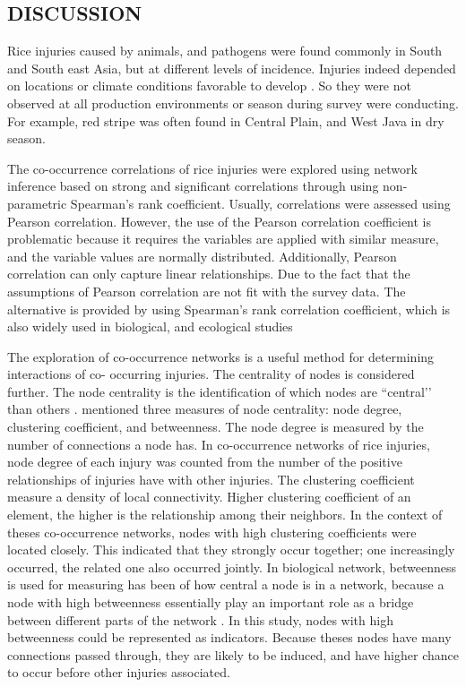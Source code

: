 \newpage
\subsection{DISCUSSION}
Rice injuries caused by animals, and pathogens were found commonly in South and South east Asia, but at different levels of incidence. Injuries indeed depended on locations or climate conditions favorable to develop \citep{Savary_2006_Quantification}. So they were not observed at all production environments or season during survey were conducting. For example, red stripe was often found in Central Plain, and West Java in dry season. 

The co-occurrence correlations of rice injuries were explored using network inference based on strong and significant correlations through using non-parametric Spearman’s rank coefficient. Usually, correlations were assessed using Pearson correlation. However, the use of the Pearson correlation coefficient is problematic because it requires the variables are applied with similar measure, and the variable values are normally distributed. Additionally, Pearson correlation can only capture linear relationships. Due to the fact that the assumptions of Pearson correlation are not fit with the survey data. The alternative is provided by using Spearman’s rank correlation coefficient, which is also widely used in biological, and ecological studies
  
The exploration of co-occurrence networks is a useful method for determining interactions of co- occurring injuries. The centrality of nodes is considered further. The node centrality is the identification of which nodes are ``central’’ than others \citep{Barrat_2004_Architecture}. \citet{Newman_2003_Structure} mentioned three measures of node centrality: node degree, clustering coefficient, and betweenness. The node degree is measured by the number of connections a node has. In co-occurrence networks of rice injuries, node degree of each injury was counted from the number of the positive relationships of injuries have with other injuries. The clustering coefficient measure a density of local connectivity. Higher clustering coefficient of an element, the higher is the relationship among their neighbors. In the context of theses co-occurrence networks, nodes with high clustering coefficients were located closely. This indicated that they strongly occur together; one increasingly occurred, the related one also occurred jointly. In biological network, betweenness is used for measuring has been of how central a node is in a network, because a node with high betweenness essentially play an important role as a bridge between different parts of the network \citep{Proulx_2005_Network, Newman_2010_Networks}. In this study, nodes with high betweenness could be represented as indicators. Because theses nodes have many connections passed through, they are likely to be induced, and have higher chance to occur before other injuries associated.

